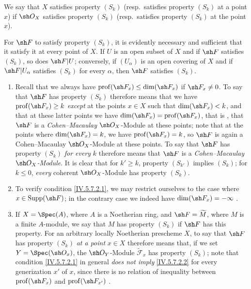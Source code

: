 We say that $X$ satisfies property $(S_k)$
(resp.\ satisfies property $(S_k)$ at a point $x$) if $\sh O_X$ satisfies
property $(S_k)$ (resp.\ satisfies property $(S_k)$ at the point $x$).

For $\sh F$ to satisfy property $(S_k)$, it is evidently necessary and
sufficient that it satisfy it at every point of $X$.  If $U$ is an open
subset of $X$ and if $\sh F$ satisfies $(S_k)$, so does $\sh F|U$;
conversely, if $(U_\alpha)$ is an open covering of $X$ and if
$\sh F|U_\alpha$ satisfies $(S_k)$ for every $\alpha$, then
$\sh F$ satisfies $(S_k)$.

\begin{remarks}[5.7.3]
\label{IV.5.7.3}
\begin{enumerate}[{\rm(i)}]
\item
{}
\label{IV.5.7.3.i}
Recall that we always have
$\operatorname{prof}(\sh F_x)\leq\dim(\sh F_x)$
 if $\sh F_x\neq0$.  To say that $\sh F$ has
property $(S_k)$ therefore means that we have
$\operatorname{prof}(\sh F_x)\geq k$ \emph{except} at the points $x\in X$
such that $\dim(\sh F_x)<k$, and that at these latter points we have
$\dim(\sh F_x)=\operatorname{prof}(\sh F_x)$, that is
, that $\sh F$ is a \emph{Cohen--Macaulay}
$\sh O_X$-Module at these points; note that at the points where
$\dim(\sh F_x)=k$, we have $\operatorname{prof}(\sh F_x)=k$,
so $\sh F$ is again a Cohen--Macaulay $\sh O_X$-Module at these
points.  To say that $\sh F$ has property $(S_k)$ \emph{for every}
$k$ therefore means that $\sh F$ is a \emph{Cohen--Macaulay
$\sh O_X$-Module}.  It is clear that for $k'\geq k$, property
$(S_{k'})$ implies $(S_k)$; for $k\leq0$, \emph{every} coherent
$\sh O_X$-Module has property $(S_k)$.

\item
{}
\label{IV.5.7.3.ii}
To verify condition \eqref{IV.5.7.2.1}, we may restrict ourselves to
the case where $x\in\operatorname{Supp}(\sh F)$; in the contrary case we
indeed have $\dim(\sh F_x)=-\infty$ .

\item
{}
\label{IV.5.7.3.iii}
If $X=\Spec(A)$, where $A$ is a Noetherian ring, and
$\sh F=\widetilde M$, where $M$ is a finite $A$-module, we say that $M$
has property $(S_k)$ if $\sh F$ has this property.
For an arbitrary locally Noetherian prescheme $X$, to say that
$\sh F$ has property $(S_k)$ \emph{at a point} $x\in X$ therefore means
that, if we set $Y=\Spec(\sh O_x)$, the $\sh O_Y$-Module
$\widetilde{\mathscr F}_x$ has property $(S_k)$; note that condition
\eqref{IV.5.7.2.1} in general \emph{does not imply}
\eqref{IV.5.7.2.2} for every generization $x'$ of $x$, since there is
no relation of inequality between
$\operatorname{prof}(\sh F_x)$ and
$\operatorname{prof}(\sh F_{x'})$ .


\end{enumerate}
\end{remarks}
